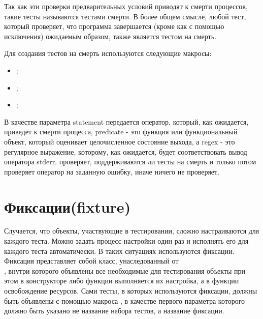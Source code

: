 \documentclass[a4paper, 11pt]{article}
\begin{document}
	Так как эти проверки предварительных условий приводят к смерти процессов, такие тесты называются тестами смерти. В более общем смысле, любой тест, который проверяет, что программа завершается (кроме как с помощью исключения) ожидаемым образом, также является тестом на смерть.
	
	Для создания тестов на смерть используются следующие макросы:
	
	\begin{itemize}
		\item {};
		\item {};
		\item {};
	\end{itemize}

	В качестве параметра statement передается оператор, который, как ожидается, приведет к смерти процесса, predicate - это функция или функциональный объект, который оценивает целочисленное состояние выхода, а regex - это регулярное выражение, которому, как ожидается, будет соответствовать вывод оператора stderr.  проверяет, поддерживаются ли тесты на смерть и только потом проверяет оператор на заданную ошибку, иначе ничего не проверяет.
	
	
	\section{Фиксации(fixture)}
	
	Случается, что объекты, участвующие в тестировании, сложно настраиваются для каждого теста. Можно задать процесс настройки один раз и исполнять его для каждого теста автоматически. В таких ситуациях используются фиксации.\\
	
	Фиксация представляет собой класс, унаследованный от\\ , внутри которого объявлены все необходимые для тестирования объекты при этом в конструкторе либо функции  выполняется их настройка, а в функции  освобождение ресурсов. Сами тесты, в которых используются фиксации, должны быть объявлены с помощью макроса , в качестве первого параметра которого должно быть указано не название набора тестов, а название фиксации.\\
	
\end{document}
